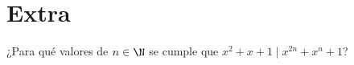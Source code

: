 \section{Extra}

\begin{section-problem}
    ¿Para qué valores de $n \in \N$ se cumple que $x^2 + x + 1 \mid x^{2n} + x^n + 1$?
\end{section-problem}